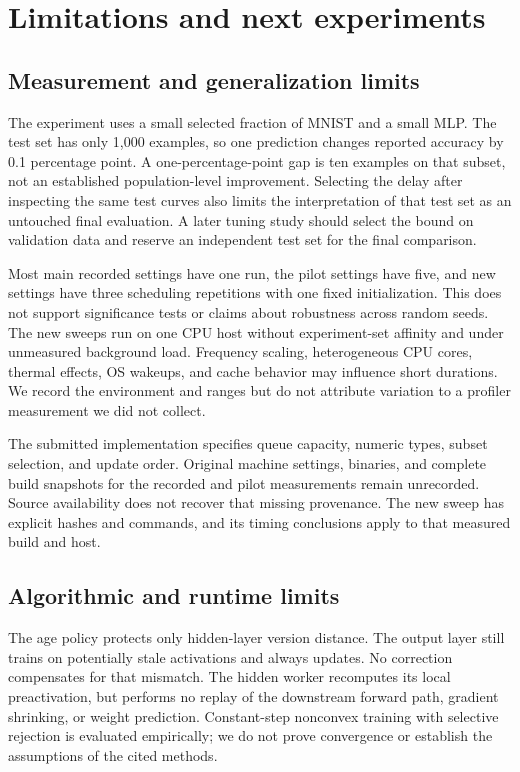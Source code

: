 \documentclass[conference]{IEEEtran}
\begin{document}
\section{Limitations and next experiments}
\subsection{Measurement and generalization limits}
The experiment uses a small selected fraction of MNIST and a small MLP. The test set has only 1,000 examples, so one prediction changes reported accuracy by 0.1 percentage point. A one-percentage-point gap is ten examples on that subset, not an established population-level improvement. Selecting the delay after inspecting the same test curves also limits the interpretation of that test set as an untouched final evaluation. A later tuning study should select the bound on validation data and reserve an independent test set for the final comparison.

Most main recorded settings have one run, the pilot settings have five, and new settings have three scheduling repetitions with one fixed initialization. This does not support significance tests or claims about robustness across random seeds. The new sweeps run on one CPU host without experiment-set affinity and under unmeasured background load. Frequency scaling, heterogeneous CPU cores, thermal effects, OS wakeups, and cache behavior may influence short durations. We record the environment and ranges but do not attribute variation to a profiler measurement we did not collect.

The submitted implementation specifies queue capacity, numeric types, subset selection, and update order. Original machine settings, binaries, and complete build snapshots for the recorded and pilot measurements remain unrecorded. Source availability does not recover that missing provenance. The new sweep has explicit hashes and commands, and its timing conclusions apply to that measured build and host.

\subsection{Algorithmic and runtime limits}
The age policy protects only hidden-layer version distance. The output layer still trains on potentially stale activations and always updates. No correction compensates for that mismatch. The hidden worker recomputes its local preactivation, but performs no replay of the downstream forward path, gradient shrinking, or weight prediction. Constant-step nonconvex training with selective rejection is evaluated empirically; we do not prove convergence or establish the assumptions of the cited methods.
\end{document}
